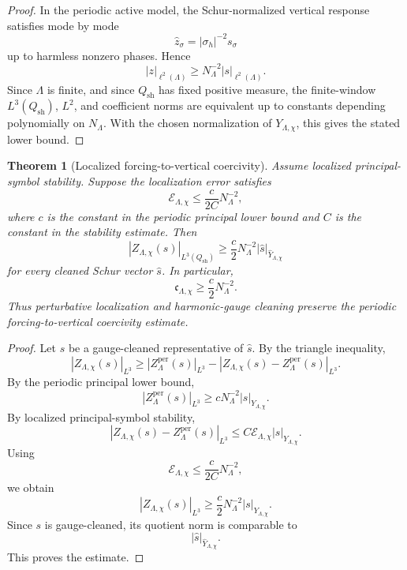 \documentclass[11pt]{article}
\numberwithin{equation}{section}
\newtheorem{theorem}{Theorem}[section]
\begin{document}
\begin{proof}
In the periodic active model, the Schur-normalized vertical response satisfies mode by mode
\[
\widehat z_\sigma =
|\sigma_h|^{-2}s_\sigma
\]
up to harmless nonzero phases. Hence
\[
|z|_{\ell^2(\Lambda)}
\ge
N_\Lambda^{-2}|s|_{\ell^2(\Lambda)}.
\]
Since \(\Lambda\) is finite, and since \(Q_{\mathrm{sh}}\) has fixed positive measure, the finite-window \(L^3(Q_{\mathrm{sh}})\), \(L^2\), and coefficient norms are equivalent up to constants depending polynomially on \(N_\Lambda\). With the chosen normalization of \(Y_{\Lambda,\chi}\), this gives the stated lower bound.
\end{proof}

\begin{theorem}[Localized forcing-to-vertical coercivity]
Assume localized principal-symbol stability. Suppose the localization error satisfies
\begin{equation}
\mathcal E_{\Lambda,\chi}
\le
\frac{c}{2C}N_\Lambda^{-2},
\label{eq:tag-10-215}
\end{equation}
where \(c\) is the constant in the periodic principal lower bound and \(C\) is the constant in the stability estimate. Then
\begin{equation}
|Z_{\Lambda,\chi}(s)|_{L^3(Q_{\mathrm{sh}})}
\ge
\frac c2
N_\Lambda^{-2}
|\widehat s|_{\widehat Y_{\Lambda,\chi}}
\label{eq:tag-10-216}
\end{equation}
for every cleaned Schur vector \(\widehat s\). In particular,
\begin{equation}
\mathfrak c_{\Lambda,\chi}
\ge
\frac c2 N_\Lambda^{-2}.
\label{eq:tag-10-217}
\end{equation}
Thus perturbative localization and harmonic-gauge cleaning preserve the periodic forcing-to-vertical coercivity estimate.

\end{theorem}

\begin{proof}
Let \(s\) be a gauge-cleaned representative of \(\widehat s\). By the triangle inequality,
\[
|Z_{\Lambda,\chi}(s)|_{L^3}
\ge
|Z_{\Lambda}^{\mathrm{per}}(s)|_{L^3} -
|Z_{\Lambda,\chi}(s)-Z_{\Lambda}^{\mathrm{per}}(s)|_{L^3}.
\]
By the periodic principal lower bound,
\[
|Z_{\Lambda}^{\mathrm{per}}(s)|_{L^3}
\ge
cN_\Lambda^{-2}|s|_{Y_{\Lambda,\chi}}.
\]
By localized principal-symbol stability,
\[
|Z_{\Lambda,\chi}(s)-Z_{\Lambda}^{\mathrm{per}}(s)|_{L^3}
\le
C\mathcal E_{\Lambda,\chi}|s|_{Y_{\Lambda,\chi}}.
\]
Using
\[
\mathcal E_{\Lambda,\chi}
\le
\frac{c}{2C}N_\Lambda^{-2},
\]
we obtain
\[
|Z_{\Lambda,\chi}(s)|_{L^3}
\ge
\frac c2 N_\Lambda^{-2}|s|_{Y_{\Lambda,\chi}}.
\]
Since \(s\) is gauge-cleaned, its quotient norm is comparable to
\[
|\widehat s|_{\widehat Y_{\Lambda,\chi}}.
\]
This proves the estimate.
\end{proof}
\end{document}
